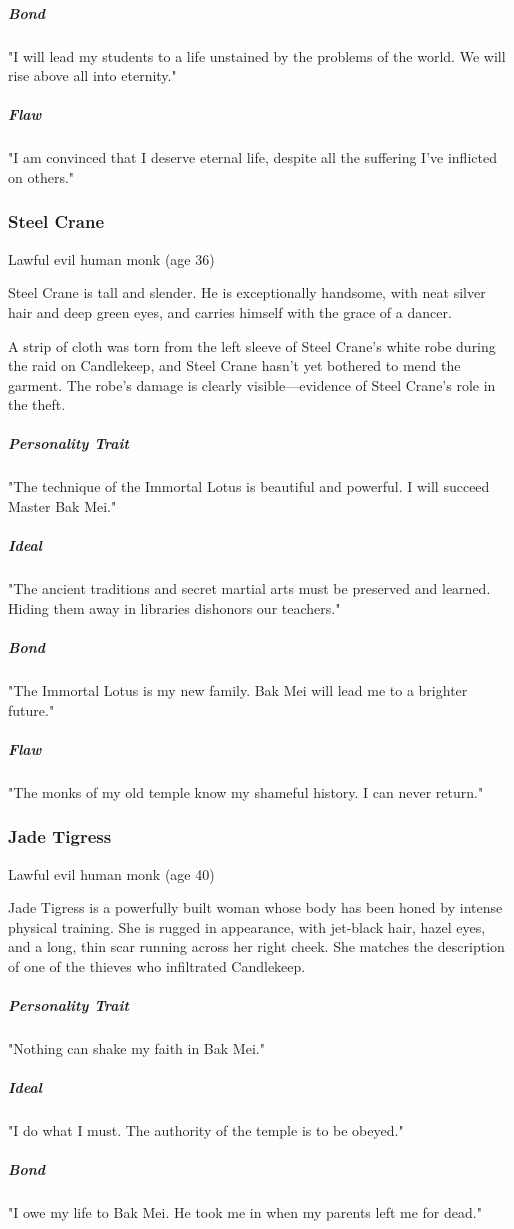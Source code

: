 \documentclass[10pt,a4paper,twoside,bg=print,twocolumn,openany,nodeprecatedcode]{dndbook}
\begin{document}
\subparagraph{Bond}
"I will lead my students to a life unstained by the problems of the world. We will rise above all into eternity."

\subparagraph{Flaw}
"I am convinced that I deserve eternal life, despite all the suffering I've inflicted on others."

\subsubsection{Steel Crane}
Lawful evil human monk (age 36)

Steel Crane is tall and slender. He is exceptionally handsome, with neat silver hair and deep green eyes, and carries himself with the grace of a dancer.

A strip of cloth was torn from the left sleeve of Steel Crane's white robe during the raid on Candlekeep, and Steel Crane hasn't yet bothered to mend the garment. The robe's damage is clearly visible—evidence of Steel Crane's role in the theft.

\subparagraph{Personality Trait}
"The technique of the Immortal Lotus is beautiful and powerful. I will succeed Master Bak Mei."

\subparagraph{Ideal}
"The ancient traditions and secret martial arts must be preserved and learned. Hiding them away in libraries dishonors our teachers."

\subparagraph{Bond}
"The Immortal Lotus is my new family. Bak Mei will lead me to a brighter future."

\subparagraph{Flaw}
"The monks of my old temple know my shameful history. I can never return."

\subsubsection{Jade Tigress}
Lawful evil human monk (age 40)

Jade Tigress is a powerfully built woman whose body has been honed by intense physical training. She is rugged in appearance, with jet-black hair, hazel eyes, and a long, thin scar running across her right cheek. She matches the description of one of the thieves who infiltrated Candlekeep.

\subparagraph{Personality Trait}
"Nothing can shake my faith in Bak Mei."

\subparagraph{Ideal}
"I do what I must. The authority of the temple is to be obeyed."

\subparagraph{Bond}
"I owe my life to Bak Mei. He took me in when my parents left me for dead."
\end{document}
